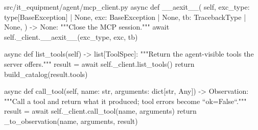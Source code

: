 \documentclass[11pt,letterpaper]{article}
\renewcommand{\_}{\textunderscore\allowbreak}
\begin{document}
\begin{codebox}{src/it_equipment/agent/mcp_client.py}
    async def __aexit__(
        self,
        exc_type: type[BaseException] | None,
        exc: BaseException | None,
        tb: TracebackType | None,
    ) -> None:
        """Close the MCP session."""
        await self._client.__aexit__(exc_type, exc, tb)

    async def list_tools(self) -> list[ToolSpec]:
        """Return the agent-visible tools the server offers."""
        result = await self._client.list_tools()
        return build_catalog(result.tools)

    async def call_tool(self, name: str, arguments: dict[str, Any]) -> Observation:
        """Call a tool and return what it produced; tool errors become ``ok=False``."""
        result = await self._client.call_tool(name, arguments)
        return _to_observation(name, arguments, result)
\end{codebox}
\end{document}
